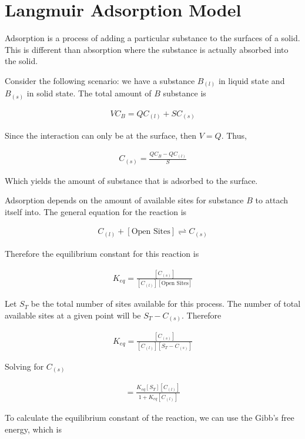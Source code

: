 \section{Langmuir Adsorption Model}

Adsorption is a process of adding a particular substance to the surfaces of a solid. This is different than absorption where the substance is actually absorbed into the solid.

Consider the following scenario: we have a substance $B_{(l)}$ in liquid state and $B_{(s)}$ in solid state. The total amount of $B$ substance is

\begin{align}
	VC_B = QC_{(l)} + S C_{(s)}
\end{align}

Since the interaction can only be at the surface, then $V = Q$. Thus,

\begin{align}
	C_{(s)} = \frac{QC_B - QC_{(l)}}{S}
\end{align}

Which yields the amount of substance that is adsorbed to the surface. 

Adsorption depends on the amount of available sites for substance $B$ to attach itself into. The general equation for the reaction is

\begin{align}
	C_{(l)} + \left[\text{Open Sites}\right] \rightleftharpoons C_{(s)}
\end{align} 

Therefore the equilibrium constant for this reaction is

\begin{align}
	K_{eq} = \frac{[C_{(s)}]}{[C_{(l)}][\text{Open Sites}]}
\end{align}

Let $S_T$ be the total number of sites available for this process. The number of total available sites at a given point will be $S_T -C_{(s)}$. Therefore

\begin{align}
	K_{eq} = \frac{[C_{(s)}]}{[C_{(l)}][S_T -C_{(s)}]}
\end{align}

Solving for $C_{(s)}$

\begin{align}
	[C_{(s)}] = \frac{K_{eq}[S_T][C_{(l)}]}{1+K_{eq}[C_{(l)}]}
\end{align} 

To calculate the equilibrium constant of the reaction, we can use the Gibb's free energy, which is

